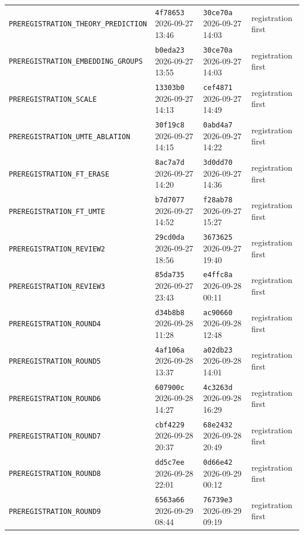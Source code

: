 \begin{center}
\begin{tabular}{llll}
\texttt{PREREGISTRATION\_THEORY\_PREDICTION} & \texttt{4f78653} 2026-09-27 13:46 & \texttt{30ce70a} 2026-09-27 14:03 & registration first \\
\texttt{PREREGISTRATION\_EMBEDDING\_GROUPS} & \texttt{b0eda23} 2026-09-27 13:55 & \texttt{30ce70a} 2026-09-27 14:03 & registration first \\
\texttt{PREREGISTRATION\_SCALE} & \texttt{13303b0} 2026-09-27 14:13 & \texttt{cef4871} 2026-09-27 14:49 & registration first \\
\texttt{PREREGISTRATION\_UMTE\_ABLATION} & \texttt{30f19c8} 2026-09-27 14:15 & \texttt{0abd4a7} 2026-09-27 14:22 & registration first \\
\texttt{PREREGISTRATION\_FT\_ERASE} & \texttt{8ac7a7d} 2026-09-27 14:20 & \texttt{3d0dd70} 2026-09-27 14:36 & registration first \\
\texttt{PREREGISTRATION\_FT\_UMTE} & \texttt{b7d7077} 2026-09-27 14:52 & \texttt{f28ab78} 2026-09-27 15:27 & registration first \\
\texttt{PREREGISTRATION\_REVIEW2} & \texttt{29cd0da} 2026-09-27 18:56 & \texttt{3673625} 2026-09-27 19:40 & registration first \\
\texttt{PREREGISTRATION\_REVIEW3} & \texttt{85da735} 2026-09-27 23:43 & \texttt{e4ffc8a} 2026-09-28 00:11 & registration first \\
\texttt{PREREGISTRATION\_ROUND4} & \texttt{d34b8b8} 2026-09-28 11:28 & \texttt{ac90660} 2026-09-28 12:48 & registration first \\
\texttt{PREREGISTRATION\_ROUND5} & \texttt{4af106a} 2026-09-28 13:37 & \texttt{a02db23} 2026-09-28 14:01 & registration first \\
\texttt{PREREGISTRATION\_ROUND6} & \texttt{607900c} 2026-09-28 14:27 & \texttt{4c3263d} 2026-09-28 16:29 & registration first \\
\texttt{PREREGISTRATION\_ROUND7} & \texttt{cbf4229} 2026-09-28 20:37 & \texttt{68e2432} 2026-09-28 20:49 & registration first \\
\texttt{PREREGISTRATION\_ROUND8} & \texttt{dd5c7ee} 2026-09-28 22:01 & \texttt{0d66e42} 2026-09-29 00:12 & registration first \\
\texttt{PREREGISTRATION\_ROUND9} & \texttt{6563a66} 2026-09-29 08:44 & \texttt{76739e3} 2026-09-29 09:19 & registration first \\
\bottomrule\end{tabular}\end{center}
